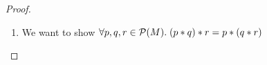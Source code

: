 \begin{proof}
\begin{enumerate}
  \begin{eqnproof}
          {Definition}
          {Logical manipulation}
          {Commutativity}
          {Definition}    
  \end{eqnproof}

\item We want to show $\forall p, q, r \in \mathcal{P}(M).\; (p * q) * r = p * (q * r)$


\end{enumerate}
\end{proof}
